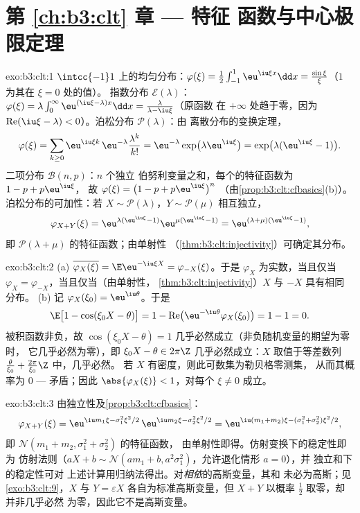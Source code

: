 \section*{第 \ref{ch:b3:clt} 章 --- 特征
函数与中心极限定理}

\begin{solution}{exo:b3:clt:1}
$\intcc{-1}1$ 上的均匀分布：$\varphi(\xi) =
\frac12\int_{-1}^1\eu^{\iu\xi x}\dd x =
\frac{\sin\xi}{\xi}$（$1$ 为其在 $\xi = 0$ 处的值）。
指数分布 $\mathcal E(\lambda)$：$\varphi(\xi) =
\lambda\int_0^\infty\eu^{(\iu\xi - \lambda)x}\dd x =
\frac{\lambda}{\lambda - \iu\xi}$（原函数
在 $+\infty$ 处趋于零，因为 $\operatorname{Re}(\iu\xi -
\lambda) < 0$）。泊松分布 $\mathcal P(\lambda)$：由
离散分布的变换定理，
\[
\varphi(\xi) = \sum_{k\geq0}\eu^{\iu\xi
k}\,\eu^{-\lambda}\frac{\lambda^k}{k!}
= \eu^{-\lambda}\exp\bigl(\lambda\eu^{\iu\xi}\bigr)
= \exp\bigl(\lambda(\eu^{\iu\xi} - 1)\bigr).
\]
二项分布 $\mathcal B(n, p)$：$n$ 个独立
伯努利变量之和，每个的特征函数为 $1 - p + p\eu^{\iu\xi}$，
故 $\varphi(\xi) = \bigl(1 - p + p\eu^{\iu\xi}\bigr)^n$
（由\cref{prop:b3:clt:cfbasics}(b)）。泊松分布的可加性：若 $X
\sim \mathcal P(\lambda)$，$Y \sim \mathcal P(\mu)$
相互独立，
\[
\varphi_{X+Y}(\xi) = \eu^{\lambda(\eu^{\iu\xi}-1)}
\eu^{\mu(\eu^{\iu\xi}-1)} =
\eu^{(\lambda+\mu)(\eu^{\iu\xi}-1)},
\]
即 $\mathcal P(\lambda + \mu)$ 的特征函数；由单射性
（\cref{thm:b3:clt:injectivity}）可确定其分布。
\end{solution}

\begin{solution}{exo:b3:clt:2}
(a) $\overline{\varphi_X(\xi)} = \E\eu^{-\iu\xi X} =
\varphi_{-X}(\xi)$。于是 $\varphi_X$ 为实数，当且仅当
$\varphi_X = \varphi_{-X}$，当且仅当（由单射性，
\cref{thm:b3:clt:injectivity}）$X$ 与 $-X$ 具有相同
分布。
(b) 记 $\varphi_X(\xi_0) = \eu^{\iu\theta}$。于是
\[
\E\bigl[1 - \cos(\xi_0X - \theta)\bigr]
= 1 - \operatorname{Re}\bigl(\eu^{-\iu\theta}
\varphi_X(\xi_0)\bigr) = 1 - 1 = 0 .
\]
被积函数非负，故 $\cos(\xi_0X - \theta) = 1$
几乎必然成立（非负随机变量的期望为零时，
它几乎必然为零），即 $\xi_0X - \theta \in 2\pi\Z$ 几乎必然成立：$X$
取值于等差数列
$\frac{\theta}{\xi_0} + \frac{2\pi}{\xi_0}\Z$ 中，几乎必然。
若 $X$ 有密度，则此可数集为勒贝格零测集，
从而其概率为 $0$ --- 矛盾；因此
$\abs{\varphi_X(\xi)} < 1$，对每个 $\xi \neq 0$ 成立。
\end{solution}

\begin{solution}{exo:b3:clt:3}
由独立性及\cref{prop:b3:clt:cfbasics}：
\[
\varphi_{X+Y}(\xi) = \eu^{\iu m_1\xi - \sigma_1^2\xi^2/2}\,
\eu^{\iu m_2\xi - \sigma_2^2\xi^2/2}
= \eu^{\iu(m_1+m_2)\xi - (\sigma_1^2+\sigma_2^2)\xi^2/2},
\]
即 $\mathcal N(m_1 + m_2, \sigma_1^2 + \sigma_2^2)$ 的特征函数，
由单射性即得。仿射变换下的稳定性即为
仿射法则（$aX + b \sim \mathcal N(am_1 + b,
a^2\sigma_1^2)$，允许退化情形 $a = 0$），并
独立和下的稳定性可对
上述计算用归纳法得出。对\emph{相依}的高斯变量，其和
未必为高斯；见\cref{exo:b3:clt:9}，$X$ 与 $Y =
\varepsilon X$ 各自为标准高斯变量，但 $X + Y$
以概率 $\frac12$ 取零，却并非几乎必然
为零，因此它不是高斯变量。
\end{solution}

